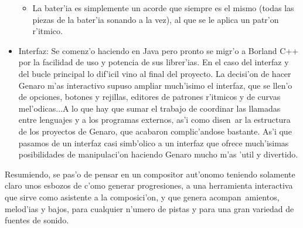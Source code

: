 \documentclass[a4paper,11pt]{article}
\begin{document}
\begin{itemize}
\begin{itemize}
                \item La bater'ia es simplemente un acorde que siempre es el mismo (todas las piezas de la bater'ia sonando a la vez), al que se le aplica un patr'on r'itmico.
                \end{itemize}
        \item Interfaz: Se comenz'o haciendo en Java pero pronto se migr'o a Borland C++ por la facilidad de uso y potencia de sus librer'ias. En el caso del interfaz y del bucle principal lo dif'icil vino al final del proyecto. La decisi'on de hacer Genaro m'as interactivo supuso ampliar much'isimo el interfaz, que se llen'o de opciones, botones y rejillas, editores de patrones r'itmicos y de curvas mel'odicas...A lo que hay que sumar el trabajo de coordinar las llamadas entre lenguajes y a los programas externos, as'i como disen~ar la estructura de los proyectos de Genaro, que acabaron complic'andose bastante. As'i que pasamos de un interfaz casi simb'olico a un interfaz que ofrece much'isimas posibilidades de manipulaci'on haciendo Genaro mucho m'as 'util y divertido.
        \end{itemize}

Resumiendo, se pas'o de pensar en un compositor aut'onomo teniendo solamente claro unos esbozos de c'omo generar progresiones, a una herramienta interactiva que sirve como asistente a la composici'on, y que genera acompan~amientos, melod'ias y bajos, para cualquier n'umero de pistas y para una gran variedad de fuentes de sonido.
\end{document}
